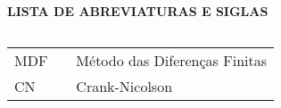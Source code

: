 \newpage

\begin{center}
\textbf{LISTA DE ABREVIATURAS E SIGLAS}
\end{center}
$\!$\\

\begin{tabular}{lll}
MDF & \hspace{1cm} & Método das Diferenças Finitas \\
CN & \hspace{1cm} & Crank-Nicolson \\
\end{tabular}